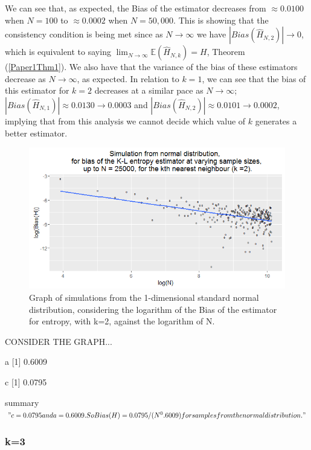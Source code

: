 \documentclass{article}
\begin{document}
We can see that, as expected, the Bias of the estimator decreases from $\approx 0.0100$ when $N=100$ to $\approx 0.0002$ when $N=50,000$. This is showing that the consistency condition is being met since as $N \to \infty$ we have $|Bias(\hat{H}_{N, 2})| \to 0$, which is equivalent to saying $\lim_{N \to \infty} \mathbb{E} (\hat{H}_{N, k}) = H$, Theorem (\ref{Paper1Thm1}). We also have that the variance of the bias of these estimators decrease as $N \to \infty$, as expected. In relation to $k=1$, we can see that the bias of this estimator for $k=2$ decreases at a similar pace as $N \to \infty$; $|Bias(\hat{H}_{N, 1})| \approx 0.0130 \to 0.0003$ and $|Bias(\hat{H}_{N, 2})| \approx 0.0101 \to 0.0002$, implying that from this analysis we cannot decide which value of $k$ generates a better estimator.

\begin{figure}
  \begin{center}
    \includegraphics[width=\textwidth]{./Graphs/Normal_k=2_plot.png}
  \end{center}
  \caption{Graph of simulations from the 1-dimensional standard normal distribution, considering the logarithm of the Bias of the estimator for entropy, with k=2, against the logarithm of N.} 
  \label{normal_k=2_graph}
\end{figure}



CONSIDER THE GRAPH...



a
[1] 0.6009

c
[1] 0.0795

summary
$"c = 0.0795 and a = 0.6009. So Bias(H) = 0.0795/(N^0.6009)  for samples from the normal distribution."$


\subsubsection{k=3} \label{N_k=3}
\end{document}
